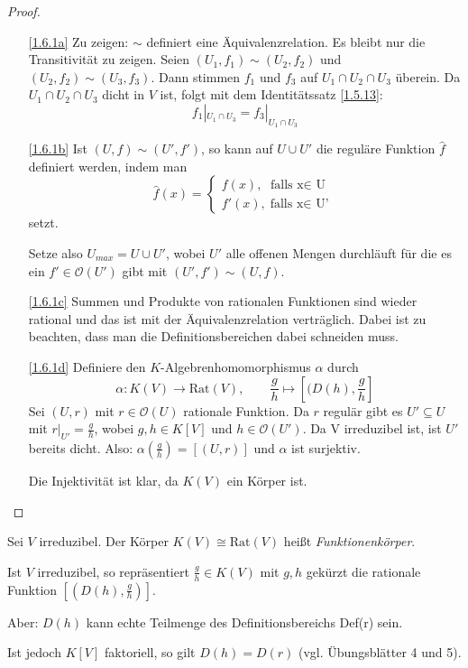 \documentclass[a4paper,12pt]{scrbook}
\newtheorem{proof}{Beweis}
\def\O{\mathcal{O}}
\newcommand{\Rat}{\mathrm{Rat}}
\newcommand{\ra}{\longrightarrow}
\newcommand{\restrict}[1]{|_{#1}}
\renewcommand{\mapsto}{\longmapsto}
\newcommand{\dach}{\widehat}
\begin{document}
\begin{proof}
\begin{enumerate}
\item[\ref{1.6.1a}] Zu zeigen: $\sim$ definiert eine Äquivalenzrelation. Es bleibt nur die Transitivität zu zeigen.
Seien $(U_1,f_1)\sim (U_2,f_2)$ und $(U_2,f_2)\sim (U_3,f_3)$. Dann stimmen $f_1$ und $f_3$ auf $U_1\cap U_2\cap U_3$ überein. Da $U_1\cap U_2\cap U_3$ dicht in $V$ ist, folgt mit dem Identitätssatz \cref{1.5.13}:
\[f_1\restrict{U_1\cap U_3}=f_3\restrict{U_1\cap U_3}\]
\item[\ref{1.6.1b}] Ist $(U,f)\sim(U',f')$, so kann auf $U\cup U'$ die reguläre Funktion $\dach{f}$ definiert werden, indem man 
\[\dach{f}(x)=\begin{cases} f(x),\text{ falls x$\in$ U} \\ f'(x),\text{falls x$\in$ U'}\end{cases}\] setzt.

Setze also $U_{max}=U\cup U'$, wobei $U'$ alle offenen Mengen durchläuft für die es ein $f'\in \O(U')$ gibt mit $(U',f')\sim (U,f)$.
\item[\ref{1.6.1c}] Summen und Produkte von rationalen Funktionen sind wieder rational und das ist mit der Äquivalenzrelation verträglich. Dabei ist zu beachten, dass man die Definitionsbereichen dabei schneiden muss.
\item[\ref{1.6.1d}] Definiere den $K$-Algebrenhomomorphismus $\alpha$ durch
\[\alpha\colon K(V)\ra \Rat(V), \qquad \frac{g}{h}\mapsto [(D(h),\frac{g}{h}]\] 
Sei $(U,r)$ mit $r\in \O(U)$ rationale Funktion. Da $r$ regulär gibt es $U'\subseteq U$ mit $r\restrict{U'}=\frac{g}{h}$, wobei $g,h \in K[V]$ und $h\in \O(U')$. Da V irreduzibel ist, ist $U'$ bereits dicht. Also: $\alpha(\frac{g}{h})=[(U,r)]$ und $\alpha$ ist surjektiv.

Die Injektivität ist klar, da $K(V)$ ein Körper ist.
\end{enumerate}
\end{proof}

\begin{dfn}\label{1.6.2}
Sei $V$ irreduzibel. Der Körper $K(V)\cong \Rat(V)$ heißt \emph{Funktionenkörper}.
\end{dfn}

\begin{w}
Ist $V$ irreduzibel, so repräsentiert $\frac{g}{h} \in K(V)$ mit $g,h$ gekürzt die rationale Funktion $[(D(h),\frac{g}{h})]$.

Aber: $D(h)$ kann echte Teilmenge des Definitionsbereichs Def(r) sein. 

Ist jedoch $K[V]$ faktoriell, so gilt $D(h)=D(r)$ (vgl. Übungsblätter 4 und 5).
\end{w}
\end{document}
